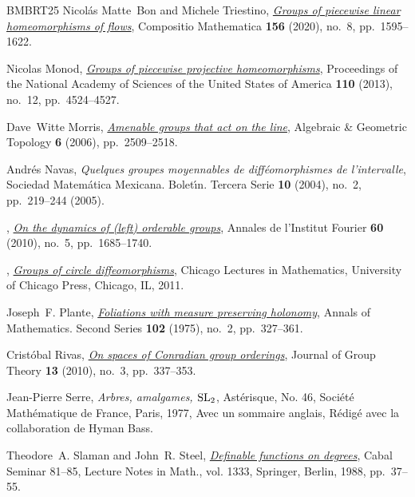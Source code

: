 \documentclass[reqno]{amsart}
\begin{document}
\begin{thebibliography}{BMBRT25}
Nicol\'{a}s Matte~Bon and Michele Triestino, \href{https://doi.org/10.1112/s0010437x20007356}{\emph{Groups of piecewise linear homeomorphisms of flows}}, Compositio Mathematica \textbf{156} (2020), no.~8, pp.~1595--1622.

Nicolas Monod, \href{https://doi.org/10.1073/pnas.1218426110}{\emph{Groups of piecewise projective homeomorphisms}}, Proceedings of the National Academy of Sciences of the United States of America \textbf{110} (2013), no.~12, pp.~4524--4527.

Dave~Witte Morris, \href{https://doi.org/10.2140/agt.2006.6.2509}{\emph{Amenable groups that act on the line}}, Algebraic \& Geometric Topology \textbf{6} (2006), pp.~2509--2518.

Andr\'{e}s Navas, \emph{Quelques groupes moyennables de diff\'{e}omorphismes de l'intervalle}, Sociedad Matem\'{a}tica Mexicana. Bolet\'{\i}n. Tercera Serie \textbf{10} (2004), no.~2, pp.~219--244 (2005).

\bysame, \href{https://doi.org/10.5802/aif.2570}{\emph{On the dynamics of (left) orderable groups}}, Annales de l'Institut Fourier \textbf{60} (2010), no.~5, pp.~1685--1740.

\bysame, \href{https://doi.org/10.7208/chicago/9780226569505.001.0001}{\emph{Groups of circle diffeomorphisms}}, Chicago Lectures in Mathematics, University of Chicago Press, Chicago, IL, 2011.

Joseph~F. Plante, \href{https://doi.org/10.2307/1971034}{\emph{Foliations with measure preserving holonomy}}, Annals of Mathematics. Second Series \textbf{102} (1975), no.~2, pp.~327--361.

Crist\'{o}bal Rivas, \href{https://doi.org/10.1515/JGT.2009.053}{\emph{On spaces of {C}onradian group orderings}}, Journal of Group Theory \textbf{13} (2010), no.~3, pp.~337--353.

Jean-Pierre Serre, \emph{Arbres, amalgames, {${\rm SL}\sb{2}$}}, Ast\'{e}risque, No. 46, Soci\'{e}t\'{e} Math\'{e}matique de France, Paris, 1977, Avec un sommaire anglais, R\'{e}dig\'{e} avec la collaboration de Hyman Bass.

Theodore~A. Slaman and John~R. Steel, \href{https://doi.org/10.1007/BFb0084969}{\emph{Definable functions on degrees}}, Cabal {S}eminar 81--85, Lecture Notes in Math., vol. 1333, Springer, Berlin, 1988, pp.~37--55.


\end{thebibliography}
\end{document}
